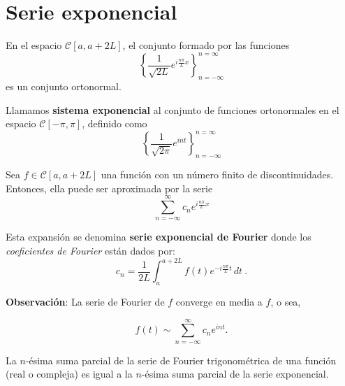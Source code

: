 \section{Serie exponencial}

\begin{propo}
    En el espacio $\mathscr{C}[a,a+2L]$, el conjunto formado por las funciones 
    \begin{equation}
        \left\{ \frac{1}{\sqrt{2L}} e^{i\frac{n\pi}{L}x} \right\}_{n= - \infty}^{n = \infty}
    \end{equation}
    es un conjunto ortonormal.
\end{propo}

\begin{defi}
    Llamamos \textbf{sistema exponencial} al conjunto de funciones ortonormales en el espacio $\mathscr{C}[-\pi,\pi]$, definido como 
    $$\left\{ \frac{1}{\sqrt{2\pi}} e^{int} \right\}_{n= - \infty}^{n = \infty}$$
\end{defi}

\begin{defi}
Sea $f \in \mathscr{C}[a,a+2L]$ una función con un número finito de discontinuidades. Entonces, ella puede ser aproximada por la serie 
\begin{equation}
     \sum_{n=- \infty}^{\infty} c_n e^{i\frac{n\pi}{L}x} \label{FourierExpo}
\end{equation}

Esta expansión se denomina \textbf{serie exponencial de Fourier}  donde los \textit{coeficientes de Fourier} están dados por:
\begin{equation*}
    c_n = \frac{1}{2L} \int_{a}^{a+2L} f(t) e^{-i\frac{n\pi}{L}t} \,dt \ .
\end{equation*}
\end{defi}

\textbf{Observación}: La serie de Fourier de $f$ converge en media a $f$, o sea, 
\begin{shaded}
 $$f(t) \sim \sum_{n=- \infty}^{\infty} c_n e^{int}.$$   
\end{shaded}

\begin{propo} \label{TrigoExpo}
La $n$-ésima suma parcial de la serie de Fourier trigonométrica de una función (real o compleja) es igual a la $n$-ésima suma parcial de la serie exponencial.
\end{propo}

